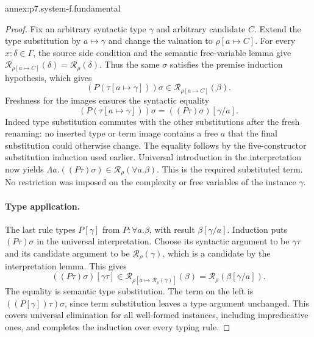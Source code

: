 \begin{annexitem}{annex:p7.system-f.fundamental}
\begin{proof}
Fix an arbitrary syntactic type \(\gamma\) and arbitrary candidate
\(C\). Extend the type substitution by \(a\mapsto\gamma\) and
change the valuation to \(\rho[a\mapsto C]\). For every
\(x:\delta\in\Gamma\), the source side condition and the semantic
free-variable lemma give
\(\mathcal R_{\rho[a\mapsto C]}(\delta)=\mathcal R_\rho(\delta)\).
Thus the same \(\sigma\) satisfies the premise induction hypothesis,
which gives
\[
 (P(\tau[a\mapsto\gamma]))\sigma
     \in\mathcal R_{\rho[a\mapsto C]}(\beta).
\]
Freshness for the images ensures the syntactic equality
\[
 (P(\tau[a\mapsto\gamma]))\sigma
       =((P\tau)\sigma)[\gamma/a].
\]
Indeed type substitution commutes with the other substitutions after the
fresh renaming: no inserted type or term image contains a free \(a\)
that the final substitution could otherwise change. The equality follows
by the five-constructor substitution induction used earlier.
Universal introduction in the interpretation now yields
\(\Lambda a.((P\tau)\sigma)\in\mathcal R_\rho(\forall a.\beta)\).
This is the required substituted term. No restriction was imposed on the
complexity or free variables of the instance \(\gamma\).

\paragraph{Type application.}
The last rule types \(P[\gamma]\) from
\(P:\forall a.\beta\), with result \(\beta[\gamma/a]\).
Induction puts \((P\tau)\sigma\) in the universal interpretation.
Choose its syntactic argument to be \(\gamma\tau\) and its
candidate argument to be \(\mathcal R_\rho(\gamma)\), which is a
candidate by the interpretation lemma. This gives
\[
 ((P\tau)\sigma)[\gamma\tau]
 \in\mathcal R_{\rho[a\mapsto\mathcal R_\rho(\gamma)]}(\beta)
 =\mathcal R_\rho(\beta[\gamma/a]).
\]
The equality is semantic type substitution. The term on the left is
\(((P[\gamma])\tau)\sigma\), since term substitution leaves a
type argument unchanged. This covers universal elimination for all
well-formed instances, including impredicative ones, and completes the
induction over every typing rule.
\end{proof}
\end{annexitem}

